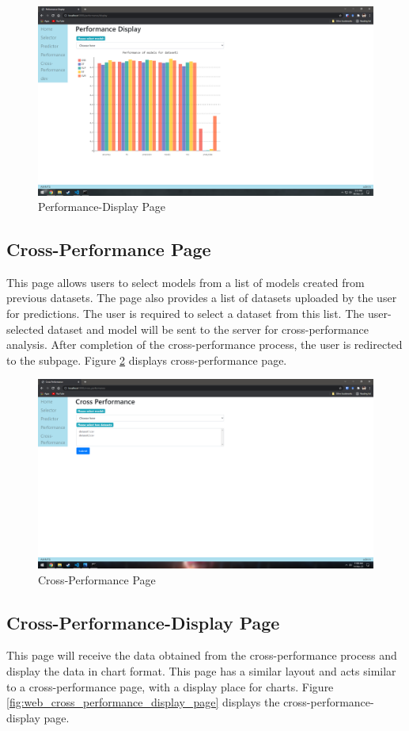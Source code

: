 \begin{figure}[H]
    \centering
    \includegraphics[width=0.7\columnwidth]{media/website/pages/04_performance_display.png}
    \caption{Performance-Display Page}
    \label{fig:web_performance_display_page}
\end{figure}

\subsection{Cross-Performance Page} \label{subsec:cross_performance_page}
This page allows users to select models from a list of models created from previous datasets.
The page also provides a list of datasets uploaded by the user for predictions. The user is
required to select a dataset from this list. The user-selected dataset and model will be sent
to the server for cross-performance analysis. After completion of the cross-performance
process, the user is redirected to the subpage. Figure \ref{fig:web_cross_performance_page}
displays cross-performance page.

\begin{figure}[H]
    \centering
    \includegraphics[width=0.7\columnwidth]{media/website/pages/05_cross_performance.png}
    \caption{Cross-Performance Page}
    \label{fig:web_cross_performance_page}
\end{figure}

\subsection{Cross-Performance-Display Page} \label{subsec:cross_performance_display Page}
This page will receive the data obtained from the cross-performance process and display the
data in chart format. This page has a similar layout and acts similar to a cross-performance
page, with a display place for charts. Figure \ref{fig:web_cross_performance_display_page}
displays the cross-performance-display page.

